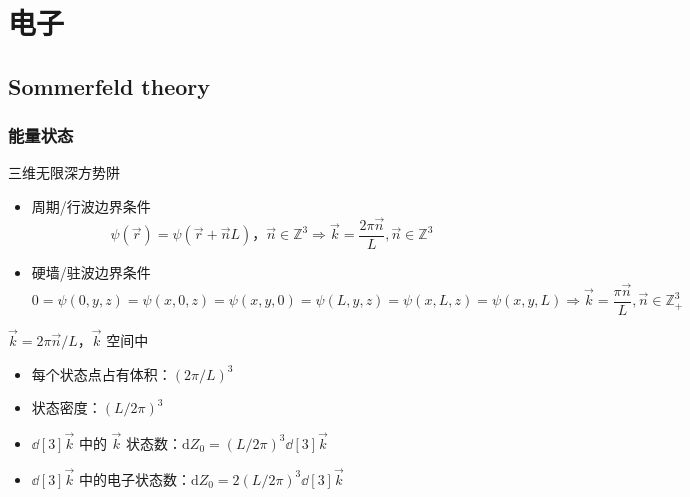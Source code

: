 \section{电子}

\subsection{Sommerfeld theory}

\subsubsection{能量状态}

三维无限深方势阱
\begin{itemize}
    \item 周期/行波边界条件 \[ \psi (\vec{r}) = \psi (\vec{r} + \vec{n} L)， \vec{n} \in \mathbb{Z}^3 \Rightarrow \vec{k} = \frac{2 \pi \vec{n}}{L}, \vec{n} \in \mathbb{Z}^3 \]
    \item 硬墙/驻波边界条件 \[ 0 = \psi (0, y, z) = \psi (x, 0, z) = \psi (x, y, 0) = \psi (L, y, z) = \psi (x, L, z) = \psi (x, y, L) \Rightarrow \vec{k} = \frac{\pi \vec{n}}{L}, \vec{n} \in \mathbb{Z}_+^3 \]
\end{itemize}

$\vec{k} = 2 \pi \vec{n} / L$，$\vec{k}$ 空间中
\begin{itemize}
    \item 每个状态点占有体积：$(2 \pi / L)^3$
    \item 状态密度：$(L / 2 \pi)^3$
    \item $\dd[3]{\vec{k}}$ 中的 $\vec{k}$ 状态数：$\mathrm{d} Z_0 = (L / 2 \pi)^3 \dd[3]{\vec{k}}$
    \item $\dd[3]{\vec{k}}$ 中的电子状态数：$\mathrm{d} Z_0 = 2 (L / 2 \pi)^3 \dd[3]{\vec{k}}$
\end{itemize}

